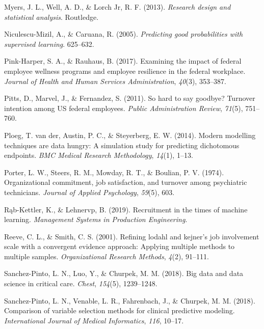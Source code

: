 \documentclass[
  man]{apa7}
\newlength{\cslhangindent}
\newlength{\cslentryspacingunit} %
\newenvironment{CSLReferences}[2] %
 {%
  \setlength{\parindent}{0pt}
  \ifodd #1
  \let\oldpar\par
  \def\par{\hangindent=\cslhangindent\oldpar}
  \fi
  \setlength{\parskip}{#2\cslentryspacingunit}
 }%
 {}
\begin{document}
\begin{CSLReferences}{1}{0}
\leavevmode{}%
Myers, J. L., Well, A. D., \& Lorch Jr, R. F. (2013). \emph{Research design and statistical analysis}. Routledge.

\leavevmode{}%
Niculescu-Mizil, A., \& Caruana, R. (2005). \emph{Predicting good probabilities with supervised learning}. 625--632.

\leavevmode{}%
Pink-Harper, S. A., \& Rauhaus, B. (2017). Examining the impact of federal employee wellness programs and employee resilience in the federal workplace. \emph{Journal of Health and Human Services Administration}, \emph{40}(3), 353--387.

\leavevmode{}%
Pitts, D., Marvel, J., \& Fernandez, S. (2011). So hard to say goodbye? Turnover intention among US federal employees. \emph{Public Administration Review}, \emph{71}(5), 751--760.

\leavevmode{}%
Ploeg, T. van der, Austin, P. C., \& Steyerberg, E. W. (2014). Modern modelling techniques are data hungry: A simulation study for predicting dichotomous endpoints. \emph{BMC Medical Research Methodology}, \emph{14}(1), 1--13.

\leavevmode{}%
Porter, L. W., Steers, R. M., Mowday, R. T., \& Boulian, P. V. (1974). Organizational commitment, job satisfaction, and turnover among psychiatric technicians. \emph{Journal of Applied Psychology}, \emph{59}(5), 603.

\leavevmode{}%
Rąb-Kettler, K., \& Lehnervp, B. (2019). Recruitment in the times of machine learning. \emph{Management Systems in Production Engineering}.

\leavevmode{}%
Reeve, C. L., \& Smith, C. S. (2001). Refining lodahl and kejner's job involvement scale with a convergent evidence approach: Applying multiple methods to multiple samples. \emph{Organizational Research Methods}, \emph{4}(2), 91--111.

\leavevmode{}%
Sanchez-Pinto, L. N., Luo, Y., \& Churpek, M. M. (2018). Big data and data science in critical care. \emph{Chest}, \emph{154}(5), 1239--1248.

\leavevmode{}%
Sanchez-Pinto, L. N., Venable, L. R., Fahrenbach, J., \& Churpek, M. M. (2018). Comparison of variable selection methods for clinical predictive modeling. \emph{International Journal of Medical Informatics}, \emph{116}, 10--17.


\end{CSLReferences}
\end{document}
